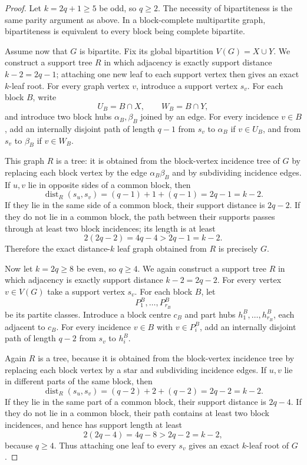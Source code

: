 \documentclass[11pt]{article}
\theoremstyle{definition}
\newcommand{\dist}{\operatorname{dist}}
\begin{document}
\begin{proof}
Let $k=2q+1\ge5$ be odd, so $q\ge2$.  The necessity of bipartiteness is the same parity argument as above.  In a block-complete multipartite graph, bipartiteness is equivalent to every block being complete bipartite.

Assume now that $G$ is bipartite.  Fix its global bipartition $V(G)=X\cup Y$.  We construct a support tree $R$ in which adjacency is exactly support distance $k-2=2q-1$; attaching one new leaf to each support vertex then gives an exact $k$-leaf root.  For every graph vertex $v$, introduce a support vertex $s_v$.  For each block $B$, write
\[
 U_B=B\cap X,\qquad W_B=B\cap Y,
\]
and introduce two block hubs $\alpha_B,\beta_B$ joined by an edge.  For every incidence $v\in B$, add an internally disjoint path of length $q-1$ from $s_v$ to $\alpha_B$ if $v\in U_B$, and from $s_v$ to $\beta_B$ if $v\in W_B$.

This graph $R$ is a tree: it is obtained from the block-vertex incidence tree of $G$ by replacing each block vertex by the edge $\alpha_B\beta_B$ and by subdividing incidence edges.  If $u,v$ lie in opposite sides of a common block, then
\[
 \dist_R(s_u,s_v)=(q-1)+1+(q-1)=2q-1=k-2.
\]
If they lie in the same side of a common block, their support distance is $2q-2$.  If they do not lie in a common block, the path between their supports passes through at least two block incidences; its length is at least
\[
 2(2q-2)=4q-4>2q-1=k-2.
\]
Therefore the exact distance-$k$ leaf graph obtained from $R$ is precisely $G$.

Now let $k=2q\ge8$ be even, so $q\ge4$.  We again construct a support tree $R$ in which adjacency is exactly support distance $k-2=2q-2$.  For every vertex $v\in V(G)$ take a support vertex $s_v$.  For each block $B$, let
\[
 P^B_1,\ldots,P^B_{r_B}
\]
be its partite classes.  Introduce a block centre $c_B$ and part hubs $h^B_1,\ldots,h^B_{r_B}$, each adjacent to $c_B$.  For every incidence $v\in B$ with $v\in P^B_i$, add an internally disjoint path of length $q-2$ from $s_v$ to $h^B_i$.

Again $R$ is a tree, because it is obtained from the block-vertex incidence tree by replacing each block vertex by a star and subdividing incidence edges.  If $u,v$ lie in different parts of the same block, then
\[
 \dist_R(s_u,s_v)=(q-2)+2+(q-2)=2q-2=k-2.
\]
If they lie in the same part of a common block, their support distance is $2q-4$.  If they do not lie in a common block, their path contains at least two block incidences, and hence has support length at least
\[
 2(2q-4)=4q-8>2q-2=k-2,
\]
because $q\ge4$.  Thus attaching one leaf to every $s_v$ gives an exact $k$-leaf root of $G$.
\end{proof}
\end{document}
